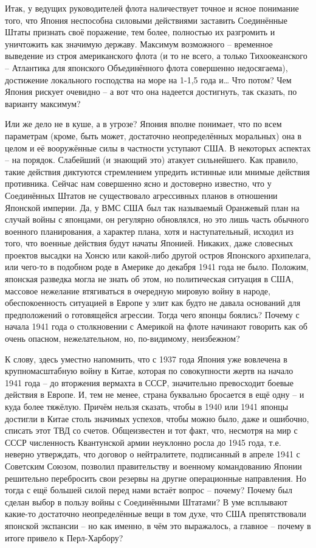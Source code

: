 Итак, у ведущих руководителей флота наличествует точное и ясное понимание того, что Япония неспособна силовыми действиями заставить Соединённые Штаты признать своё поражение, тем более, полностью их разгромить и уничтожить как значимую державу. Максимум возможного – временное выведение из строя американского флота (и то не всего, а только Тихоокеанского – Атлантика для японского Объединённого флота совершенно недосягаема), достижение локального господства на море на 1-1,5 года и… Что потом? Чем Япония рискует очевидно – а вот что она надеется достигнуть, так сказать, по варианту максимум?

Или же дело не в куше, а в угрозе? Япония вполне понимает, что по всем параметрам (кроме, быть может, достаточно неопределённых моральных) она в целом и её вооружённые силы в частности уступают США. В некоторых аспектах – на порядок. Слабейший (и знающий это) атакует сильнейшего. Как правило, такие действия диктуются стремлением упредить истинные или мнимые действия противника. Сейчас нам совершенно ясно и достоверно известно, что у Соединённых Штатов не существовало агрессивных планов в отношении Японской империи. Да, у ВМС США был так называемый Оранжевый план на случай войны с японцами, он регулярно обновлялся, но это лишь часть обычного военного планирования, а характер плана, хотя и наступательный, исходил из того, что военные действия будут начаты Японией. Никаких, даже словесных проектов высадки на Хонсю или какой-либо другой остров Японского архипелага, или чего-то в подобном роде в Америке до декабря 1941 года не было. Положим, японская разведка могла не знать об этом, но политическая ситуация в США, массовое нежелание втягиваться в очередную мировую войну в народе, обеспокоенность ситуацией в Европе у элит как будто не давала оснований для предположений о готовящейся агрессии. Тогда чего японцы боялись? Почему с начала 1941 года о столкновении с Америкой на флоте начинают говорить как об очень опасном, нежелательном, но, по-видимому, неизбежном?

К слову, здесь уместно напомнить, что с 1937 года Япония уже вовлечена в крупномасштабную войну в Китае, которая по совокупности жертв на начало 1941 года – до вторжения вермахта в СССР, значительно превосходит боевые действия в Европе. И, тем не менее, страна буквально бросается в ещё одну – и куда более тяжёлую. Причём нельзя сказать, чтобы в 1940 или 1941 японцы достигли в Китае столь значимых успехов, чтобы можно было, даже и ошибочно, списать этот ТВД со счетов. Общеизвестен и тот факт, что, несмотря на мир с СССР численность Квантунской армии неуклонно росла до 1945 года, т.е. неверно утверждать, что договор о нейтралитете, подписанный в апреле 1941 с Советским Союзом, позволил правительству и военному командованию Японии решительно перебросить свои резервы на другие операционные направления. Но тогда с ещё большей силой перед нами встаёт вопрос – почему? Почему был сделан выбор в пользу войны с Соединёнными Штатами? В уме всплывают какие-то достаточно неопределённые вещи в том духе, что США препятствовали японской экспансии – но как именно, в чём это выражалось, а главное – почему в итоге привело к Перл-Харбору? 

